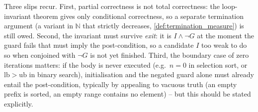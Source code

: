 \begin{remark}
Three slips recur. First, partial correctness is not total correctness: the loop-invariant theorem gives only conditional correctness, so a separate termination argument (a variant in $\mathbb{N}$ that strictly decreases, \cref{def:termination_measure}) is still owed. Second, the invariant must survive \emph{exit}: it is $I \wedge \neg G$ at the moment the guard fails that must imply the post-condition, so a candidate $I$ too weak to do so when conjoined with $\neg G$ is not yet finished. Third, the boundary case of zero iterations matters: if the body is never executed (e.g.\ $n = 0$ in selection sort, or $\mathrm{lb} > \mathrm{ub}$ in binary search), initialisation and the negated guard alone must already entail the post-condition, typically by appealing to vacuous truth (an empty prefix is sorted, an empty range contains no element) -- but this should be stated explicitly.
\end{remark}

